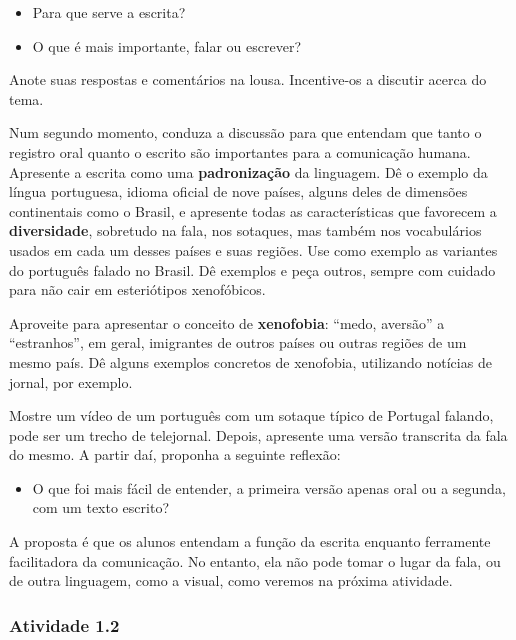\documentclass[11pt]{extarticle}
\begin{document}
\begin{itemize}
\item Para que serve a escrita?
\item O que é mais importante, falar ou escrever? 
\end{itemize}

Anote suas respostas e comentários na lousa. Incentive-os a discutir acerca do tema. 

Num segundo momento, conduza a discussão para que entendam que tanto o registro oral 
quanto o escrito são importantes para a comunicação humana. Apresente a escrita
como uma \textbf{padronização} da linguagem. Dê o exemplo da língua portuguesa,
idioma oficial de nove países, alguns deles de dimensões continentais como o Brasil, e apresente
todas as características que favorecem a \textbf{diversidade}, sobretudo na fala,
nos sotaques, mas também nos vocabulários usados em cada um desses países e suas regiões. Use como exemplo as variantes do português falado no Brasil.
Dê exemplos e peça outros, sempre com cuidado para não cair em esteriótipos xenofóbicos. 

Aproveite para apresentar o conceito de \textbf{xenofobia}: ``medo, aversão'' a ``estranhos'', em geral, imigrantes
de outros países ou outras regiões de um mesmo país. Dê alguns exemplos concretos de 
xenofobia, utilizando notícias de jornal, por exemplo. 

Mostre um vídeo de um português com um sotaque típico de Portugal falando, pode ser um trecho de 
telejornal. Depois, apresente uma versão transcrita da fala do mesmo. 
A partir daí, proponha a seguinte reflexão:

\begin{itemize}
\item O que foi mais fácil de entender, a primeira versão apenas oral ou a segunda,
com um texto escrito? 
\end{itemize}

A proposta é que os alunos entendam a função da escrita enquanto ferramente facilitadora
da comunicação. No entanto, ela não pode tomar o lugar da fala, ou de outra linguagem,
como a visual, como veremos na próxima atividade.

\subsubsection{Atividade 1.2}
\end{document}

